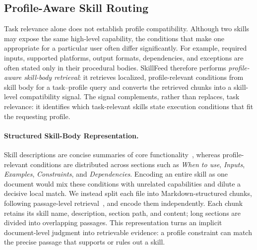 \documentclass[letterpaper]{article} %
\begin{document}


\subsection{Profile-Aware Skill Routing}
\label{subsection:two_stage_inference}

Task relevance alone does not establish profile compatibility. Although two skills may expose the same high-level capability, the conditions that make one appropriate for a particular user often differ significantly. For example, required inputs, supported platforms, output formats, dependencies, and exceptions are often stated only in their procedural bodies. SkillFeed therefore performs \emph{profile-aware skill-body retrieval}: it retrieves localized, profile-relevant conditions from skill body for a task--profile query and converts the retrieved chunks into a skill-level compatibility signal. The signal complements, rather than replaces, task relevance: it identifies which task-relevant skills state execution conditions that fit the requesting profile.

\paragraph{Structured Skill-Body Representation.}
Skill descriptions are concise summaries of core functionality~\cite{openai2026skills}, whereas profile-relevant conditions are distributed across sections such as \textit{When to use}, \textit{Inputs}, \textit{Examples}, \textit{Constraints}, and \textit{Dependencies}. Encoding an entire skill as one document would mix these conditions with unrelated capabilities and dilute a decisive local match. We instead split each file into Markdown-structured chunks, following passage-level retrieval~\citep{lewis2020rag}, and encode them independently. Each chunk retains its skill name, description, section path, and content; long sections are divided into overlapping passages. This representation turns an implicit document-level judgment into retrievable evidence: a profile constraint can match the precise passage that supports or rules out a skill.
\end{document}

